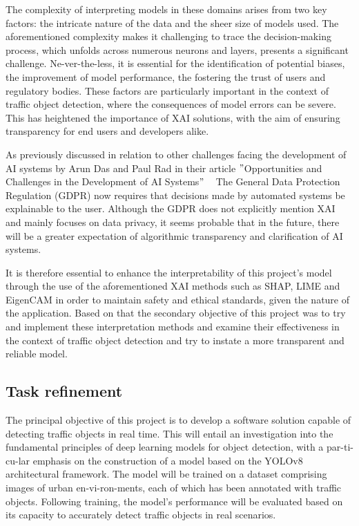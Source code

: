 The complexity of interpreting models in these domains arises from two key factors: the intricate nature of the data and the sheer size of models used.
The aforementioned complexity makes it challenging to trace the decision-making process, which unfolds across numerous neurons and layers,
presents a significant challenge.
Ne-ver-the-less, it is essential for the identification of potential biases, the improvement of model performance, the fostering the trust of users and regulatory bodies.
These factors are particularly important in the context of traffic object detection, where the consequences of model errors can be severe.
This has heightened the importance of XAI solutions, with the aim of ensuring transparency for end users and developers alike.

As previously discussed in relation to other challenges facing the development of AI systems by Arun Das and Paul Rad in their article
\("\)Opportunities and Challenges in the Development of AI Systems\("\) ~\cite{das2020opportunitieschallengesexplainableartificial}
The General Data Protection Regulation (GDPR) now requires that decisions made by automated systems be
explainable to the user.
Although the GDPR does not explicitly mention XAI and mainly focuses on data privacy,
it seems probable that in the future, there will be a greater expectation of algorithmic transparency and clarification of AI systems.

It is therefore essential to enhance the interpretability of this project's model through the use of the aforementioned
XAI methods such as SHAP, LIME and EigenCAM in order to maintain safety and ethical standards, given the nature of the
application.
Based on that the secondary objective of this project was to try and implement these interpretation methods and examine their
effectiveness in the context of traffic object detection and try to instate a more transparent and reliable model.

\subsection{Task refinement}\label{subsec:Refinement-of-the-task} %


The principal objective of this project is to develop a software solution capable of detecting traffic objects in real time.
This will entail an investigation into the fundamental principles of deep learning models for object detection, with a
par-ti-cu-lar emphasis on the construction of a model based on the YOLOv8 architectural framework.
The model will be trained on a dataset comprising images of urban en-vi-ron-ments, each of which has been annotated with
traffic objects.
Following training, the model's performance will be evaluated based on its capacity to accurately detect traffic objects
in real scenarios.

